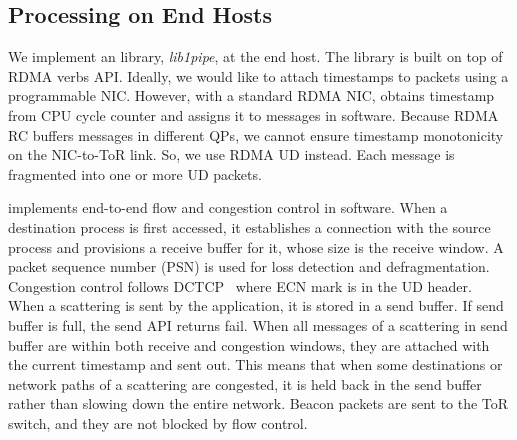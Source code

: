 \subsection{Processing on End Hosts}



We implement an \sys{} library, \textit{lib1pipe}, at the end host. The library is built on top of RDMA verbs API.
Ideally, we would like to attach timestamps to packets using a programmable NIC.
However, with a standard RDMA NIC, \sys{} obtains timestamp from CPU cycle counter and assigns it to messages in software.
Because RDMA RC buffers messages in different QPs, we cannot ensure timestamp monotonicity on the NIC-to-ToR link.
So, we use RDMA UD instead.
Each \sys{} message is fragmented into one or more UD packets.%

\sys{} implements end-to-end flow and congestion control in software. When a destination process is first accessed, it establishes a connection with the source process and provisions a receive buffer for it, whose size is the receive window. A packet sequence number (PSN) is used for loss detection and defragmentation. Congestion control follows DCTCP~\cite{alizadeh2010data} where ECN mark is in the UD header. When a scattering is sent by the application, it is stored in a send buffer. If send buffer is full, the send API returns fail. When all messages of a scattering in send buffer are within both receive and congestion windows, they are attached with the current timestamp and sent out.
This means that when some destinations or network paths of a scattering are congested, it is held back in the send buffer rather than slowing down the entire network.
Beacon packets are sent to the ToR switch, and they are not blocked by flow control.

